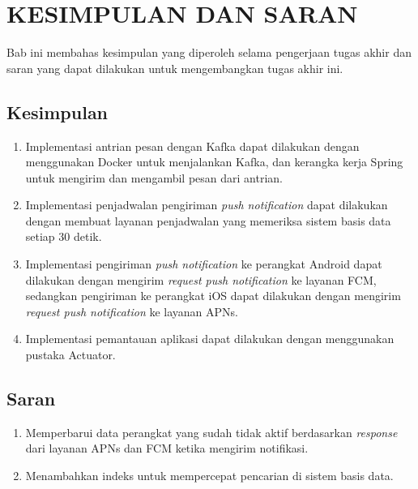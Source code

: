\chapter{KESIMPULAN DAN SARAN}
\par Bab ini membahas kesimpulan yang diperoleh selama pengerjaan tugas akhir dan saran yang dapat dilakukan untuk mengembangkan tugas akhir ini.

\section{Kesimpulan}
\begin{enumerate}
	\item Implementasi antrian pesan dengan Kafka dapat dilakukan dengan menggunakan Docker untuk menjalankan Kafka, dan kerangka kerja Spring untuk mengirim dan mengambil pesan dari antrian.
	\item Implementasi penjadwalan pengiriman \textit{push notification} dapat dilakukan dengan membuat layanan penjadwalan yang memeriksa sistem basis data setiap 30 detik.
	\item Implementasi pengiriman \textit{push notification} ke perangkat Android dapat dilakukan dengan mengirim \textit{request push notification} ke layanan FCM, sedangkan pengiriman ke perangkat iOS dapat dilakukan dengan mengirim \textit{request push notification} ke layanan APNs.
	\item Implementasi pemantauan aplikasi dapat dilakukan dengan menggunakan pustaka Actuator.
\end{enumerate}

\section{Saran}
\begin{enumerate}
    \item Memperbarui data perangkat yang sudah tidak aktif berdasarkan \textit{response} dari layanan APNs dan FCM ketika mengirim notifikasi.
    \item Menambahkan indeks untuk mempercepat pencarian di sistem basis data.
\end{enumerate}
